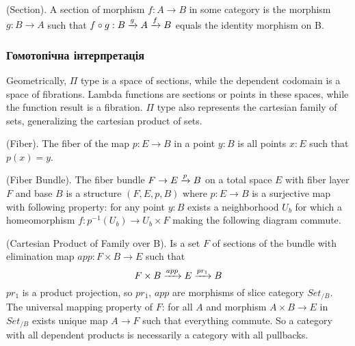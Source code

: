 \begin{definition} (Section).
A section of morphism $f: A \rightarrow B$ in some category is the morphism $g: B \rightarrow A$
such that $f \circ g: B \xrightarrow{{g}} A \xrightarrow{{f}} B$ equals the identity morphism on B.
\end{definition}

\subsubsection*{Гомотопічна інтерпретація}
Geometrically, $\Pi$ type is a space of sections, while the dependent codomain is a space of fibrations.
Lambda functions are sections or points in these spaces, while the function result is a fibration.
$\Pi$ type also represents the cartesian family of sets, generalizing the cartesian product of sets.

\begin{definition} (Fiber).
The fiber of the map $p: E \rightarrow B$ in a point $y: B$ is all points $x: E$ such that $p(x)=y$.
\end{definition}

\begin{definition} (Fiber Bundle).
The fiber bundle $ F \rightarrow E \xrightarrow{{p}} B$ on a total space $E$ with fiber layer $F$ and base $B$ is a
structure $(F,E,p,B)$ where $p: E \rightarrow B$ is a surjective map with following property:
for any point $y: B$ exists a neighborhood $U_b$ for which a homeomorphism $f: p^{-1}(U_b) \rightarrow U_b \times F$
making the following diagram commute.
\begin{center}
\end{center}
\end{definition}

\begin{definition} (Cartesian Product of Family over B).
Is a set $F$ of sections of the bundle with elimination map $app : F \times B \rightarrow E$ such that
\begin{equation}
F \times B \xrightarrow{{app}} E \xrightarrow{{pr_1}} B
\end{equation}
$pr_1$ is a product projection, so $pr_1$, $app$ are morphisms
of slice category $Set_{/B}$. The universal mapping property of $F$:
for all $A$ and morphism $A \times B \rightarrow E$ in $Set_{/B}$ exists
unique map $A \rightarrow F$ such that everything commute. So a category
with all dependent products is necessarily a category with all pullbacks.
\end{definition}


